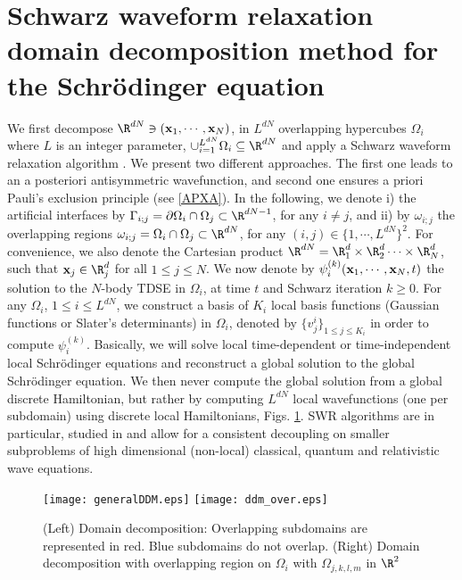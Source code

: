 \section{Schwarz waveform relaxation domain decomposition method for the Schr\"odinger equation}\label{SWR}
We first decompose $\R^{dN}\ni ({\bf x}_1,\cdots,{\bf x}_N)$, in $L^{dN}$ overlapping hypercubes $\Omega_i$ where $L$ is an integer parameter, $\cup_{i=1}^{L^{dN}}\Omega_i \subseteq \R^{dN}$ and apply a Schwarz waveform relaxation algorithm \cite{lorin-TBS,lorin-TBS2}. We present two different approaches. The first one leads to an a posteriori antisymmetric wavefunction, and second one ensures a priori Pauli's exclusion principle (see \ref{APXA}). In the following, we denote i) the artificial interfaces by $\Gamma_{i;j}=\partial \Omega_i \cap \Omega_j \subset \R^{dN-1}$, for any $i\neq j$, and ii) by $\omega_{i;j}$ the overlapping regions $\omega_{i;j}=\Omega_i\cap \Omega_j \subset \R^{dN}$, for any $(i,j) \in \{1,\cdots,L^{dN}\}^2$. For convenience, we also denote the Cartesian product $\R^{dN} = \R_1^d \times \R_{2}^d\cdots \times \R_N^d$, such that ${\bf x}_j \in \R^d_j$ for all $1\leq j\leq N$. We now denote by $\psi^{(k)}_i({\bf x}_1,\cdots,{\bf x}_N,t)$ the solution to the $N$-body TDSE in $\Omega_i$, at time $t$ and Schwarz iteration $k \geq 0$. For any $\Omega_i$, $1\leq i\leq L^{dN}$, we construct a basis of $K_i$ local basis functions (Gaussian functions or Slater's determinants) in $\Omega_i$, denoted by $\big\{v^i_j\big\}_{1\leq j\leq K_i}$ in order to compute $\psi_i^{(k)}$.   Basically, we will solve local time-dependent or time-independent local Schr\"odinger equations and reconstruct a global solution to the global Schr\"odinger equation. We then never compute the global solution from a global discrete Hamiltonian, but rather by computing $L^{dN}$ local wavefunctions (one per subdomain) using discrete local Hamiltonians, Figs. \ref{generalDDM}.  SWR algorithms are in particular, studied in \cite{halpern3,GanderHalpernNataf} and allow for a consistent decoupling on smaller subproblems of high dimensional (non-local) classical, quantum and relativistic wave equations.
\begin{figure}[!ht]
\begin{center}
\hspace*{1mm}\texttt{[image: generalDDM.eps]}
\hspace*{1mm}\texttt{[image: ddm\_over.eps]}
\caption{(Left) Domain decomposition: Overlapping subdomains are represented in red. Blue subdomains do not overlap. (Right) Domain decomposition with overlapping region on $\Omega_i$ with $\Omega_{j,k,l,m}$ in $\R^2$}
\label{generalDDM}
\end{center}
\end{figure}
